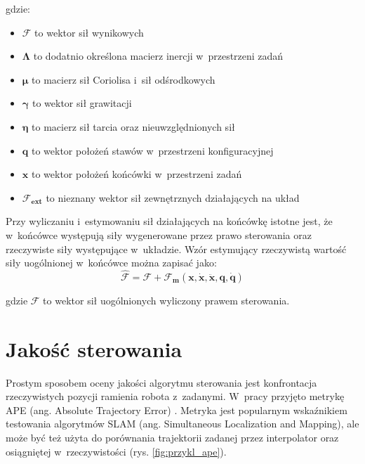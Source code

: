 gdzie:
\begin{itemize}
	\item $\boldsymbol{\mathcal{F}}$ to wektor sił wynikowych
	\item $\boldsymbol{\Lambda}$ to dodatnio określona macierz inercji w~przestrzeni zadań
	\item $\boldsymbol{\mu}$ to macierz sił Coriolisa i~sił odśrodkowych	
	\item $\boldsymbol{\gamma}$ to wektor sił grawitacji
	\item $\boldsymbol{\eta}$ to macierz sił tarcia oraz nieuwzględnionych sił
	\item $\boldsymbol{q}$ to wektor położeń stawów w~przestrzeni konfiguracyjnej
	\item $\boldsymbol{x}$ to wektor położeń końcówki w~przestrzeni zadań
	\item $ \boldsymbol{\mathcal{F}_{ext}}$ to nieznany wektor sił zewnętrznych działających na układ
\end{itemize} 

Przy wyliczaniu i~estymowaniu sił działających na końcówkę istotne jest, że w~końcówce występują siły wygenerowane przez prawo sterowania oraz rzeczywiste siły występujące w~układzie. Wzór estymujący rzeczywistą wartość siły uogólnionej w~końcówce można zapisać jako:
\begin{equation}
\boldsymbol{\mathcal{\hat{F}}} = \boldsymbol{\mathcal{F}} + \boldsymbol{\mathcal{F}_m}(\boldsymbol{x}, \dot{\boldsymbol{x}}, \ddot{\boldsymbol{x}}, \boldsymbol{q}, \dot{\boldsymbol{q}})
\end{equation}

gdzie $\boldsymbol{\mathcal{F}}$ to wektor sił uogólnionych wyliczony prawem sterowania.

\section{Jakość sterowania}
\label{chap:ape}
Prostym sposobem oceny jakości algorytmu sterowania jest konfrontacja rzeczywistych pozycji ramienia robota z~zadanymi. W~pracy przyjęto metrykę APE (ang. Absolute Trajectory Error) \cite{bib:ape}. Metryka jest popularnym wskaźnikiem testowania algorytmów SLAM (ang. Simultaneous Localization and Mapping), ale może być też użyta do porównania trajektorii zadanej przez interpolator  oraz osiągniętej w~rzeczywistości (rys. \ref{fig:przykl_ape}). 

